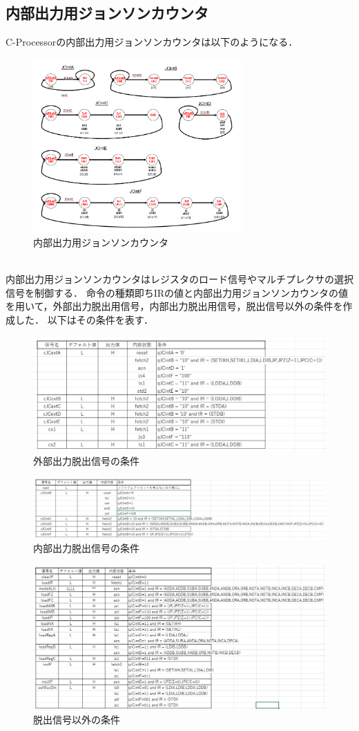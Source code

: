 \documentclass[dvipdfmx]{jarticle}
\begin{document}
\subsection{内部出力用ジョンソンカウンタ}
C-Processorの内部出力用ジョンソンカウンタは以下のようになる．
\begin{figure}[h]
  \centering
  \includegraphics[width = 8cm]{int.png}
  \caption{内部出力用ジョンソンカウンタ}
\end{figure}
\\内部出力用ジョンソンカウンタはレジスタのロード信号やマルチプレクサの選択信号を制御する．
命令の種類即ちIRの値と内部出力用ジョンソンカウンタの値を用いて，外部出力脱出用信号，内部出力脱出用信号，脱出信号以外の条件を作成した．
以下はその条件を表す．
\begin{figure}[h]
  \centering
  \includegraphics[width = 12cm]{cJCext.png}
  \caption{外部出力脱出信号の条件}
\end{figure}
\begin{figure}[h]
  \centering
  \includegraphics[width = 12cm]{cJCint.png}
  \caption{内部出力脱出信号の条件}
\end{figure}
\begin{figure}[h]
  \centering
  \includegraphics[width = 12cm]{others.png}
  \caption{脱出信号以外の条件}
\end{figure}
\clearpage
\end{document}

